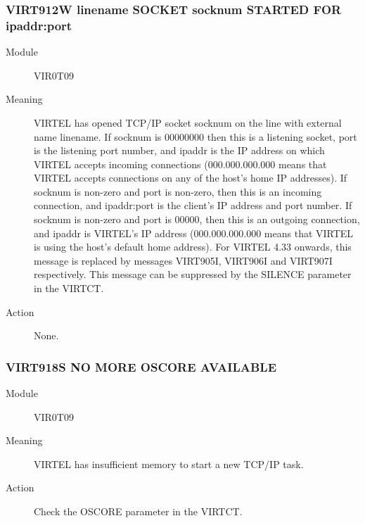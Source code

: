 \documentclass[letterpaper,10pt,english]{sphinxmanual}
\begin{document}
\subsubsection{VIRT912W linename SOCKET socknum STARTED FOR ipaddr:port}
\label{\detokenize{messages:virt912w-linename-socket-socknum-started-for-ipaddr-port}}\begin{description}
\item[{Module}] \leavevmode
VIR0T09

\item[{Meaning}] \leavevmode
VIRTEL has opened TCP/IP socket socknum on the line with external name linename. If socknum is 00000000 then this is a listening socket, port is the listening port number, and ipaddr is the IP address on which VIRTEL accepts incoming connections (000.000.000.000 means that VIRTEL accepts connections on any of the host’s home IP addresses). If socknum is non-zero and port is non-zero, then this is an incoming connection, and ipaddr:port is the client’s IP address and port number. If socknum is non-zero and port is 00000, then this is an outgoing connection, and ipaddr is VIRTEL’s  IP address (000.000.000.000 means that VIRTEL is using the host’s default home address).  For VIRTEL 4.33 onwards, this message is replaced by messages VIRT905I, VIRT906I and VIRT907I respectively. This message can be suppressed by the SILENCE parameter in the VIRTCT.

\item[{Action}] \leavevmode
None.

\end{description}


\subsubsection{VIRT918S NO MORE OSCORE AVAILABLE}
\label{\detokenize{messages:virt918s-no-more-oscore-available}}\begin{description}
\item[{Module}] \leavevmode
VIR0T09

\item[{Meaning}] \leavevmode
VIRTEL has insufficient memory to start a new TCP/IP task.

\item[{Action}] \leavevmode
Check the OSCORE parameter in the VIRTCT.

\end{description}
\end{document}
